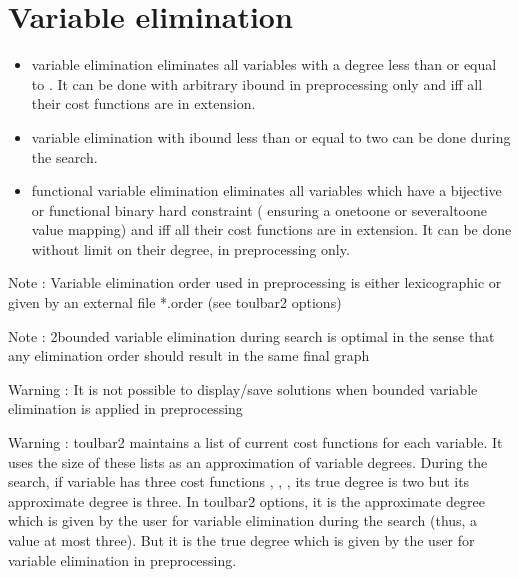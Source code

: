 \documentclass[letterpaper,10pt,openany,oneside,english]{sphinxmanual}
\begin{document}
\section{Variable elimination}
\label{\detokenize{ref/ref_modules:variable-elimination}}

\begin{fulllineitems}

\pysigstartsignatures
{}
\pysigstopsignatures
\sphinxAtStartPar
\begin{itemize}
\item {} 
\sphinxAtStartPar
{} variable elimination eliminates all variables with a degree less than or equal to . It can be done with arbitrary i\sphinxhyphen{}bound in preprocessing only and iff all their cost functions are in extension.

\item {} 
\sphinxAtStartPar
{} variable elimination with i\sphinxhyphen{}bound less than or equal to two can be done during the search.

\item {} 
\sphinxAtStartPar
functional variable elimination eliminates all variables which have a bijective or functional binary hard constraint ( ensuring a one\sphinxhyphen{}to\sphinxhyphen{}one or several\sphinxhyphen{}to\sphinxhyphen{}one value mapping) and iff all their cost functions are in extension. It can be done without limit on their degree, in preprocessing only.

\end{itemize}


\sphinxAtStartPar
Note : Variable elimination order used in preprocessing is either lexicographic or given by an external file *.order (see toulbar2 options)

\sphinxAtStartPar
Note : 2\sphinxhyphen{}bounded variable elimination during search is optimal in the sense that any elimination order should result in the same final graph

\sphinxAtStartPar
Warning : It is not possible to display/save solutions when bounded variable elimination is applied in preprocessing

\sphinxAtStartPar
Warning : toulbar2 maintains a list of current cost functions for each variable. It uses the size of these lists as an approximation of variable degrees. During the search, if variable  has three cost functions , , , its true degree is two but its approximate degree is three. In toulbar2 options, it is the approximate degree which is given by the user for variable elimination during the search (thus, a value at most three). But it is the true degree which is given by the user for variable elimination in preprocessing. 

\end{fulllineitems}
\end{document}
